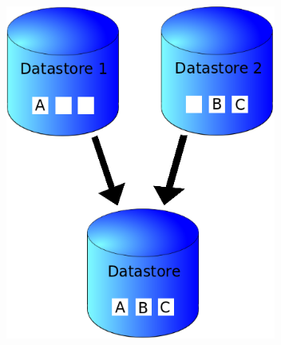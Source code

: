 \vspace{1cm}
\begin{figure}[H]
  \centering
    \includegraphics[height= 11cm, width=17cm]{project/images/data-sync}
\end{figure}